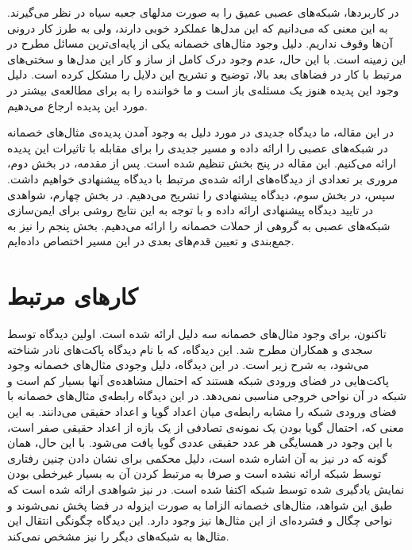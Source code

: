 \documentclass[12pt,onecolumn,a4paper]{article}
\begin{document}
در کاربردها، شبکه‌های عصبی عمیق را به صورت مدلهای جعبه سیاه در نظر می‌گیرند. به این معنی که می‌دانیم که این مدل‌ها عملکرد خوبی دارند، ولی به طرز کار درونی آن‌ها وقوف نداریم. دلیل وجود مثال‌های خصمانه یکی از پایه‌ای‌ترین مسائل  مطرح در این زمینه است. با این حال، عدم وجود درک کامل از ساز و کار این مدل‌ها و سختی‌های مرتبط با کار در فضاهای بعد بالا، توضیح و تشریح این دلایل را مشکل کرده است. دلیل وجود این پدیده هنوز یک مسئله‌ی باز است و ما خواننده را به \cite{Yuan_2019} برای مطالعه‌ی بیشتر در مورد این پدیده ارجاع می‌دهیم.

در این مقاله، ما دیدگاه جدیدی در مورد دلیل به وجود آمدن پدیده‌ی مثال‌های خصمانه در شبکه‌های عصبی را ارائه داده و مسیر جدیدی را برای مقابله با تاثیرات این پدیده ارائه می‌کنیم. این مقاله در پنج بخش تنظیم شده است. پس از مقدمه، در بخش دوم، مروری بر تعدادی از دیدگاه‌های ارائه شده‌ی مرتبط با دیدگاه پیشنهادی خواهیم داشت. سپس، در بخش سوم، دیدگاه پیشنهادی را تشریح می‌دهیم. در بخش چهارم، شواهدی  در تایید دیدگاه پیشنهادی ارائه داده و با توجه به این نتایج روشی برای ایمن‌سازی شبکه‌های عصبی به گروهی از حملات خصمانه را ارائه می‌دهیم. بخش پنجم را نیز به جمع‌بندی و تعیین قدم‌های بعدی در این مسیر اختصاص داده‌ایم.

\section{کارهای مرتبط}
تاکنون، برای وجود مثال‌های خصمانه سه دلیل ارائه شده است. اولین دیدگاه توسط سجدی و همکاران\cite{szegedy2013intriguing}
مطرح شد. این دیدگاه، که با نام دیدگاه پاکت‌های نادر شناخته می‌شود، به شرح زیر است. در این دیدگاه، دلیل وجودی مثال‌های خصمانه وجود پاکت‌هایی در فضای ورودی شبکه هستند که احتمال مشاهده‌ی آنها بسیار کم است و شبکه در آن نواحی خروجی مناسبی نمی‌دهد. در این دیدگاه رابطه‌ی مثال‌های خصمانه با فضای ورودی شبکه را مشابه رابطه‌ی میان اعداد گویا و اعداد حقیقی می‌دانند. به این معنی که، احتمال گویا بودن یک نمونه‌ی تصادفی از یک بازه از اعداد حقیقی صفر است، با این وجود در همسایگی هر عدد حقیقی عددی گویا یافت می‌شود. با این حال،
همان گونه که در
\cite{tanay2016boundary}
نیز به آن اشاره شده است، دلیل محکمی برای نشان دادن چنین رفتاری توسط شبکه ارائه نشده است و صرفا به مرتبط کردن آن به بسیار غیرخطی بودن نمایش یادگیری شده توسط شبکه اکتفا شده است. در 
\cite{Tabacof_2016}
 نیز شواهدی ارائه شده است که طبق این شواهد، مثال‌های خصمانه الزاما به صورت ایزوله در فضا پخش نمی‌شوند و نواحی چگال و فشرده‌ای از این مثال‌ها نیز وجود دارد. این دیدگاه چگونگی انتقال این مثال‌ها به شبکه‌های دیگر را نیز مشخص نمی‌کند.
\end{document}
